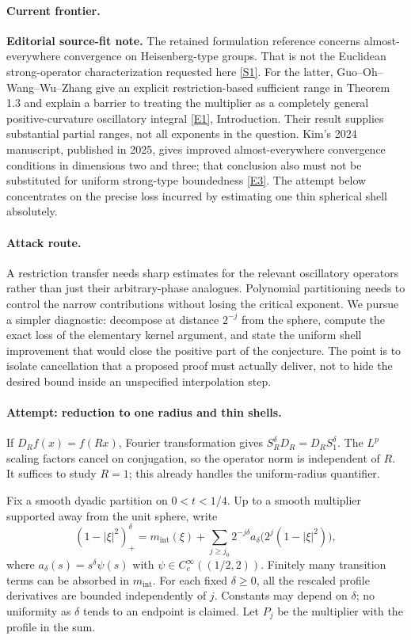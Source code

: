 \documentclass[11pt,a4paper]{article}
\newcommand{\sref}[2]{\hyperlink{source:#1:#2}{[S#2]}}
\newcommand{\eref}[2]{\hyperlink{extra:#1:#2}{[E#2]}}
\numberwithin{equation}{section}
\begin{document}
\paragraph{Current frontier.}
\textbf{Editorial source-fit note.} The retained formulation reference
concerns almost-everywhere convergence on Heisenberg-type groups. That is
not the Euclidean strong-operator characterization requested here
\sref{30006774}{1}. For the latter, Guo--Oh--Wang--Wu--Zhang give an explicit
restriction-based sufficient range in Theorem 1.3 and explain a barrier to
treating the multiplier as a completely general positive-curvature
oscillatory integral \eref{30006774}{1}, Introduction. Their result supplies
substantial partial ranges, not all exponents in the question. Kim's
2024 manuscript, published in 2025, gives improved almost-everywhere
convergence conditions in dimensions two and three; that conclusion also
must not be substituted for uniform strong-type boundedness
\eref{30006774}{3}. The attempt below concentrates on the precise loss incurred
by estimating one thin spherical shell absolutely.

\paragraph{Attack route.}
A restriction transfer needs sharp estimates for the relevant oscillatory
operators rather than just their arbitrary-phase analogues. Polynomial
partitioning needs to control the narrow contributions without losing the
critical exponent. We pursue a simpler diagnostic: decompose at distance
$2^{-j}$ from the sphere, compute the exact loss of the elementary
kernel argument, and state the uniform shell improvement that would close
the positive part of the conjecture. The point is to isolate cancellation
that a proposed proof must actually deliver, not to hide the desired bound
inside an unspecified interpolation step.

\paragraph{Attempt: reduction to one radius and thin shells.}
If $D_Rf(x)=f(Rx)$, Fourier transformation gives
$S_R^\delta D_R=D_RS_1^\delta$. The $L^p$ scaling factors cancel on
conjugation, so the operator norm is independent of $R$. It suffices to
study $R=1$; this already handles the uniform-radius quantifier.

Fix a smooth dyadic partition on $0<t<1/4$. Up to a smooth multiplier
supported away from the unit sphere, write
\begin{equation}\label{eq180-shells}
 (1-|\xi|^2)_+^\delta
 =m_{\mathrm{int}}(\xi)+\sum_{j\ge j_0}2^{-j\delta}
          a_\delta\bigl(2^j(1-|\xi|^2)\bigr),
\end{equation}
where $a_\delta(s)=s^\delta\psi(s)$ with
$\psi\in C_c^\infty((1/2,2))$. Finitely many transition terms can be
absorbed in $m_{\mathrm{int}}$. For each fixed $\delta\ge0$, all the
rescaled profile derivatives are bounded independently of $j$. Constants
may depend on $\delta$; no uniformity as $\delta$ tends to an endpoint is
claimed. Let $P_j$ be the multiplier with the profile in the sum.
\end{document}
